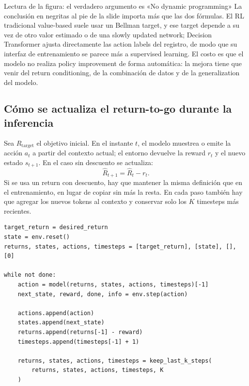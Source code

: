\begin{knowledgebox}{Lectura de la figura: el verdadero argumento es «No dynamic programming»}
La conclusión en negritas al pie de la slide importa más que las dos fórmulas. El RL tradicional value-based suele usar un Bellman target, y ese target depende a su vez de otro valor estimado o de una slowly updated network; Decision Transformer ajusta directamente las action labels del registro, de modo que su interfaz de entrenamiento se parece más a supervised learning. El costo es que el modelo no realiza policy improvement de forma automática: la mejora tiene que venir del return conditioning, de la combinación de datos y de la generalization del modelo.
\end{knowledgebox}


\subsection{Cómo se actualiza el return-to-go durante la inferencia}

Sea $R_{\mathrm{target}}$ el objetivo inicial. En el instante $t$, el modelo muestrea o emite la acción $a_t$ a partir del contexto actual; el entorno devuelve la reward $r_t$ y el nuevo estado $s_{t+1}$. En el caso sin descuento se actualiza:
\[
\widehat{R}_{t+1}=\widehat{R}_t-r_t.
\]
Si se usa un return con descuento, hay que mantener la misma definición que en el entrenamiento, en lugar de copiar sin más la resta. En cada paso también hay que agregar los nuevos tokens al contexto y conservar solo los $K$ timesteps más recientes.


\begin{lstlisting}[caption={Rollout autoregressive con return-to-go sin descuento},label={lst:dt-rollout}]
target_return = desired_return
state = env.reset()
returns, states, actions, timesteps = [target_return], [state], [], [0]

while not done:
    action = model(returns, states, actions, timesteps)[-1]
    next_state, reward, done, info = env.step(action)

    actions.append(action)
    states.append(next_state)
    returns.append(returns[-1] - reward)
    timesteps.append(timesteps[-1] + 1)

    returns, states, actions, timesteps = keep_last_k_steps(
        returns, states, actions, timesteps, K
    )
\end{lstlisting}

